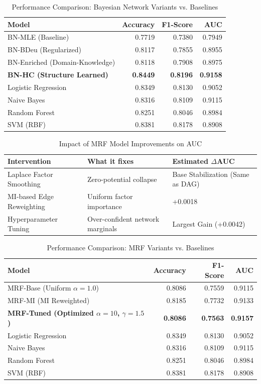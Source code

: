 \documentclass{article}
\begin{document}
\begin{table}[h]
\centering
\caption{Performance Comparison: Bayesian Network Variants vs. Baselines}
\label{tab:bn_comparison}
\begin{tabular}{lrrr}
\hline
\textbf{Model} & \textbf{Accuracy} & \textbf{F1-Score} & \textbf{AUC} \\ \hline
BN-MLE (Baseline) & 0.7719 & 0.7380 & 0.7949 \\
BN-BDeu (Regularized) & 0.8117 & 0.7855 & 0.8955 \\
BN-Enriched (Domain-Knowledge) & 0.8118 & 0.7908 & 0.8975 \\
\textbf{BN-HC (Structure Learned)} & \textbf{0.8449} & \textbf{0.8196} & \textbf{0.9158} \\ \hline
Logistic Regression & 0.8349 & 0.8130 & 0.9052 \\
Naive Bayes & 0.8316 & 0.8109 & 0.9115 \\
Random Forest & 0.8251 & 0.8046 & 0.8984 \\
SVM (RBF) & 0.8381 & 0.8178 & 0.8908 \\ \hline
\end{tabular}
\end{table}

\begin{table}[h]
\centering
\caption{Impact of MRF Model Improvements on AUC}
\label{tab:mrf_improvements}
\begin{tabular}{lll}
\hline
\textbf{Intervention} & \textbf{What it fixes} & \textbf{Estimated $\Delta$AUC} \\ \hline
Laplace Factor Smoothing & Zero-potential collapse & Base Stabilization (Same as DAG) \\
MI-based Edge Reweighting & Uniform factor importance & +0.0018 \\
Hyperparameter Tuning & Over-confident network marginals & Largest Gain (+0.0042) \\ \hline
\end{tabular}
\end{table}

\begin{table}[h]
\centering
\caption{Performance Comparison: MRF Variants vs. Baselines}
\label{tab:mrf_comparison}
\begin{tabular}{lrrr}
\hline
\textbf{Model} & \textbf{Accuracy} & \textbf{F1-Score} & \textbf{AUC} \\ \hline
MRF-Base (Uniform $\alpha=1.0$) & 0.8086 & 0.7559 & 0.9115 \\
MRF-MI (MI Reweighted) & 0.8185 & 0.7732 & 0.9133 \\
\textbf{MRF-Tuned (Optimized $\alpha=10$, $\gamma=1.5$)} & \textbf{0.8086} & \textbf{0.7563} & \textbf{0.9157} \\ \hline
Logistic Regression & 0.8349 & 0.8130 & 0.9052 \\
Naive Bayes & 0.8316 & 0.8109 & 0.9115 \\
Random Forest & 0.8251 & 0.8046 & 0.8984 \\
SVM (RBF) & 0.8381 & 0.8178 & 0.8908 \\ \hline
\end{tabular}
\end{table}
\end{document}
